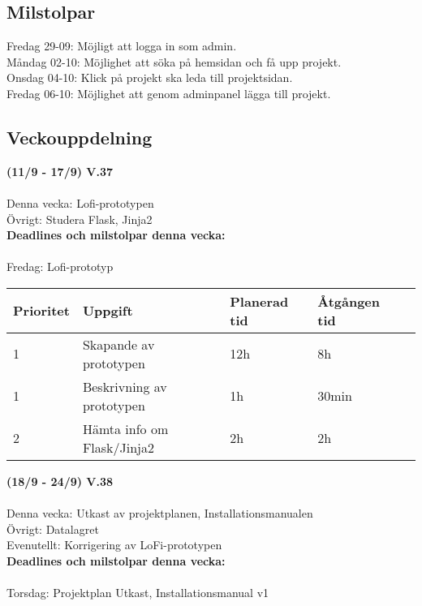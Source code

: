 \documentclass{TDP003mall}
\begin{document}
\subsection{Milstolpar}
Fredag 29-09: Möjligt att logga in som admin.\\
Måndag 02-10: Möjlighet att söka på hemsidan och få upp projekt.\\
Onsdag 04-10: Klick på projekt ska leda till projektsidan.\\
Fredag 06-10: Möjlighet att genom adminpanel lägga till projekt.\\

\subsection{Veckouppdelning}
\textbf{(11/9 - 17/9) V.37}\\\\
Denna vecka: Lofi-prototypen\\
Övrigt: Studera Flask, Jinja2\\

\textbf{Deadlines och milstolpar denna vecka: }\\\\
Fredag: Lofi-prototyp

\begin{table}[]
  \begin{tabular}{|l|l|l|l|l|}
  \hline
   Prioritet & Uppgift                    & Planerad tid & Åtgången tid \\ \hline
   1         & Skapande av prototypen     & 12h          & 8h           \\ \hline
   1         & Beskrivning av prototypen  & 1h           & 30min        \\ \hline
   2         & Hämta info om Flask/Jinja2 & 2h           & 2h           \\ \hline
  \end{tabular}
  \end{table}


\hrulefill
\pagebreak

\textbf{(18/9 - 24/9) V.38}\\\\

  Denna vecka: Utkast av projektplanen, Installationsmanualen\\
  Övrigt: Datalagret\\
  Evenutellt: Korrigering av LoFi-prototypen\\

  \textbf{Deadlines och milstolpar denna vecka: }\\\\
  Torsdag: Projektplan Utkast, Installationsmanual v1
\end{document}
